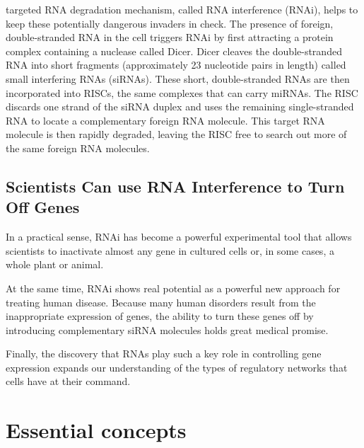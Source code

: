 targeted RNA degradation mechanism, called RNA interference (RNAi), helps to keep these 
potentially dangerous invaders in check.
The presence of foreign, double-stranded RNA in the cell triggers RNAi by
first attracting a protein complex containing a nuclease called Dicer. Dicer
cleaves the double-stranded RNA into short fragments (approximately 23 nucleotide 
pairs in length) called small interfering RNAs (siRNAs).
These short, double-stranded RNAs are then incorporated into RISCs, the
same complexes that can carry miRNAs. The RISC discards one strand of
the siRNA duplex and uses the remaining single-stranded RNA to locate
a complementary foreign RNA molecule. This target RNA
molecule is then rapidly degraded, leaving the RISC free to search out
more of the same foreign RNA molecules.

\subsection{Scientists Can use RNA Interference to Turn Off Genes}

In a practical sense, RNAi has become a powerful experimental tool that allows scientists to inactivate almost
any gene in cultured cells or, in some cases, a whole plant or animal.

At the same time, RNAi shows real potential as a powerful new approach
for treating human disease. Because many human disorders result from
the inappropriate expression of genes, the ability to turn these genes off
by introducing complementary siRNA molecules holds great medical
promise.

Finally, the discovery that RNAs play such a key role in controlling gene
expression expands our understanding of the types of regulatory networks
that cells have at their command.

\section{Essential concepts}

